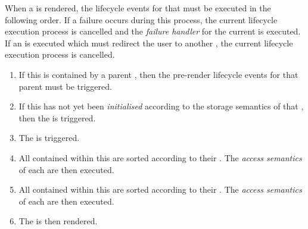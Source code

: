 When a  is rendered, the lifecycle events for that  must be executed in the following order. If a failure occurs during this process, the current lifecycle execution process is cancelled and the \textit{failure handler} for the current  is executed. If an  is executed which must redirect the user to another , the current lifecycle execution process is cancelled.

\begin{enumerate}
  \item If this  is contained by a parent , then the pre-render lifecycle events for that parent  must be triggered.
  
  \item If this  has not yet been \textit{initialised} according to the storage semantics of that , then the   is triggered. 

  \item The   is triggered.

  \item All  contained within this  are sorted according to their . The \textit{access semantics} of each  are then executed.

  \item All  contained within this  are sorted according to their . The \textit{access semantics} of each  are then executed.
  
  \item The  is then rendered.
\end{enumerate}